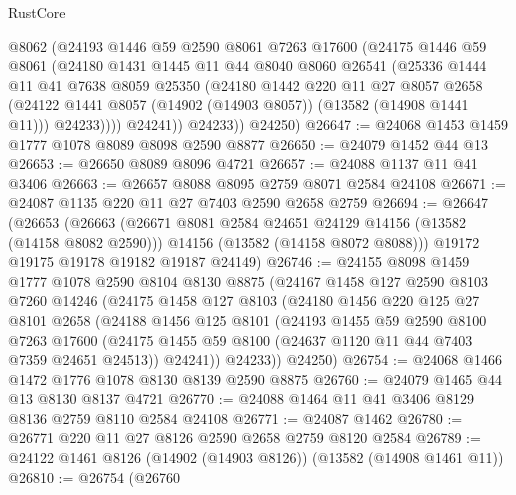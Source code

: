 \begin{lexlean}{RustCore}
\begin{coremodule}
            @8062
            (@24193
              @1446
              @59
              @2590
              @8061
              @7263
              @17600
              (@24175
                @1446
                @59
                @8061
                (@24180
                  @1431
                  @1445
                  @11
                  @44
                  @8040
                  @8060
                  @26541
                  (@25336
                    @1444
                    @11
                    @41
                    @7638
                    @8059
                    @25350
                    (@24180
                      @1442
                      @220
                      @11
                      @27
                      @8057
                      @2658
                      (@24122 @1441 @8057 (@14902 (@14903 @8057)) (@13582 (@14908 @1441 @11)))
                      @24233))))
              @24241))
          @24233))
      @24250)
@26647 := @24068 @1453 @1459 @1777 @1078 @8089 @8098 @2590 @8877
@26650 := @24079 @1452 @44 @13
@26653 := @26650 @8089 @8096 @4721
@26657 := @24088 @1137 @11 @41 @3406
@26663 := @26657 @8088 @8095 @2759 @8071 @2584 @24108
@26671 := @24087 @1135 @220 @11 @27 @7403 @2590 @2658 @2759
@26694 := @26647
    (@26653
      (@26663
        (@26671 @8081 @2584 @24651 @24129 @14156 (@13582 (@14158 @8082 @2590)))
        @14156
        (@13582 (@14158 @8072 @8088)))
      @19172
      @19175
      @19178
      @19182
      @19187
      @24149)
@26746 := @24155
    @8098
    @1459
    @1777
    @1078
    @2590
    @8104
    @8130
    @8875
    (@24167
      @1458
      @127
      @2590
      @8103
      @7260
      @14246
      (@24175
        @1458
        @127
        @8103
        (@24180
          @1456
          @220
          @125
          @27
          @8101
          @2658
          (@24188
            @1456
            @125
            @8101
            (@24193
              @1455
              @59
              @2590
              @8100
              @7263
              @17600
              (@24175 @1455 @59 @8100 (@24637 @1120 @11 @44 @7403 @7359 @24651 @24513))
              @24241))
          @24233))
      @24250)
@26754 := @24068 @1466 @1472 @1776 @1078 @8130 @8139 @2590 @8875
@26760 := @24079 @1465 @44 @13 @8130 @8137 @4721
@26770 := @24088 @1464 @11 @41 @3406 @8129 @8136 @2759 @8110 @2584 @24108
@26771 := @24087 @1462
@26780 := @26771 @220 @11 @27 @8126 @2590 @2658 @2759 @8120 @2584
@26789 := @24122 @1461 @8126 (@14902 (@14903 @8126)) (@13582 (@14908 @1461 @11))
@26810 := @26754
    (@26760

\end{coremodule}
\end{lexlean}
